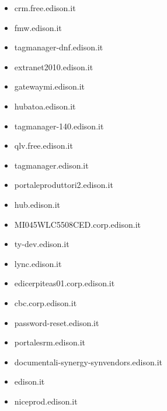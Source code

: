 \documentclass{article}
\begin{document}
\begin{itemize}
    
        \item crm.free.edison.it
    
        \item fmw.edison.it
    
        \item tagmanager-dnf.edison.it
    
        \item extranet2010.edison.it
    
        \item gatewaymi.edison.it
    
        \item hubatoa.edison.it
    
        \item tagmanager-140.edison.it
    
        \item qlv.free.edison.it
    
        \item tagmanager.edison.it
    
        \item portaleproduttori2.edison.it
    
        \item hub.edison.it
    
        \item MI045WLC5508CED.corp.edison.it
    
        \item ty-dev.edison.it
    
        \item lync.edison.it
    
        \item edicerpiteas01.corp.edison.it
    
        \item cbc.corp.edison.it
    
        \item password-reset.edison.it
    
        \item portalesrm.edison.it
    
        \item documentali-synergy-synvendors.edison.it
    
        \item edison.it
    
        \item niceprod.edison.it
    

\end{itemize}
\end{document}
